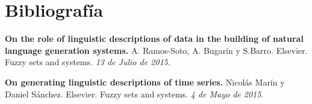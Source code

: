 \documentclass[10pt,a4paper]{article}
\begin{document}
\newpage

\section{Bibliografía}
\begin{enumerate}[{[}1{]}]
\item \textbf{On the role of linguistic descriptions of data in the building of natural language generation systems.} A. Ramos-Soto, A. Bugarín y S.Barro. Elsevier. Fuzzy sets and systems. \textit{13 de Julio de 2015}.
\item \textbf{On generating linguistic descriptions of time series.} Nicolás Marín y Daniel Sánchez. Elsevier. Fuzzy sets and systems. \textit{4 de Mayo de 2015}.
\end{enumerate}
\end{document}

